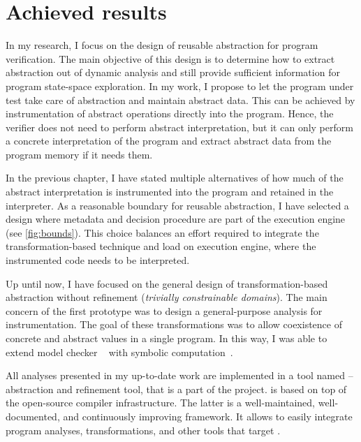 \chapter{Achieved results}
\label{ch:results}


In my research, I focus on the design of reusable abstraction for program
verification. The main objective of this design is to determine how to extract
abstraction out of dynamic analysis and still provide sufficient information
for program state-space exploration. In my work, I propose to let the program
under test take care of abstraction and maintain abstract data. This can be
achieved by instrumentation of abstract operations directly into the program.
Hence, the verifier does not need to perform abstract interpretation, but it
can only perform a concrete interpretation of the program and extract abstract
data from the program memory if it needs them.

In the previous chapter, I have stated multiple alternatives of how much of the
abstract interpretation is instrumented into the program and retained in the
interpreter.  As a reasonable boundary for reusable abstraction, I have
selected a design where metadata and decision procedure are part of the
execution engine (see \autoref{fig:bounds}). This choice balances an effort
required to integrate the transformation-based technique and load on execution
engine, where the instrumented code needs to be interpreted.

Up until now, I have focused on the general design of trans\-for\-mation-based
abstraction without refinement (\emph{trivially constrainable domains}). The
main concern of the first prototype was to design a general-purpose analysis
for instrumentation. The goal of these transformations was to allow coexistence
of concrete and abstract values in a single program. In this way, I was able to
extend model checker \divine~\cite{Divine17} with symbolic
computation~\cite{Lauko2019Sym, Lauko2018SymComp}.

All analyses presented in my up-to-date work are implemented in a tool named
\lart -- \llvm abstraction and refinement tool, that is a part of the \divine
project. \lart is based on top of the open-source \llvm compiler
infrastructure.  The latter is a well-maintained, well-documented, and
continuously improving framework. It allows \lart to easily integrate program
analyses, transformations, and other tools that target \llvm.

